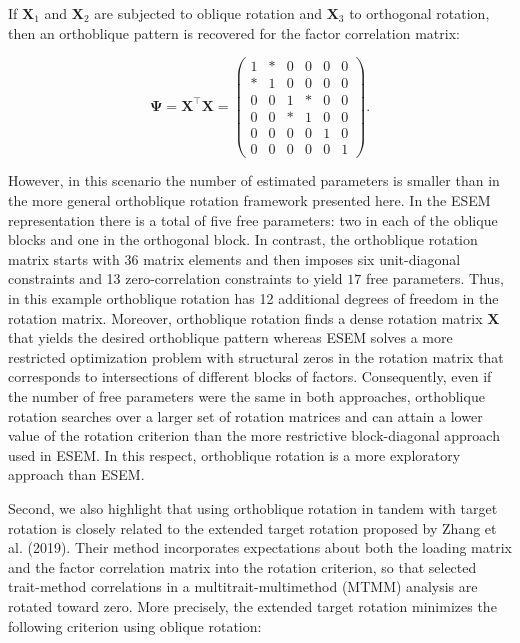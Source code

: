 \documentclass[
  12pt,
  letterpaper,
  article]{scrartcl}
\begin{document}
If \(\mathbf{X}_1\) and \(\mathbf{X}_2\) are subjected to oblique
rotation and \(\mathbf{X}_3\) to orthogonal rotation, then an
orthoblique pattern is recovered for the factor correlation matrix:

\[
\mathbf{\Psi} =
\mathbf{X}^\top\mathbf{X} =
\left(
\begin{array}{cc|cc|cc}
1&\ast&0&0&0&0\\
\ast&1&0&0&0&0\\ \hline
0&0&1&\ast&0&0\\
0&0&\ast&1&0&0\\ \hline
0&0&0&0&1&0\\
0&0&0&0&0&1
\end{array}
\right).
\]

However, in this scenario the number of estimated parameters is smaller
than in the more general orthoblique rotation framework presented here.
In the ESEM representation there is a total of five free parameters: two
in each of the oblique blocks and one in the orthogonal block. In
contrast, the orthoblique rotation matrix starts with 36 matrix elements
and then imposes six unit-diagonal constraints and 13 zero-correlation
constraints to yield \(17\) free parameters. Thus, in this example
orthoblique rotation has 12 additional degrees of freedom in the
rotation matrix. Moreover, orthoblique rotation finds a dense rotation
matrix \(\mathbf{X}\) that yields the desired orthoblique pattern
whereas ESEM solves a more restricted optimization problem with
structural zeros in the rotation matrix that corresponds to
intersections of different blocks of factors. Consequently, even if the
number of free parameters were the same in both approaches, orthoblique
rotation searches over a larger set of rotation matrices and can attain
a lower value of the rotation criterion than the more restrictive
block-diagonal approach used in ESEM. In this respect, orthoblique
rotation is a more exploratory approach than ESEM.

Second, we also highlight that using orthoblique rotation in tandem with
target rotation is closely related to the extended target rotation
proposed by Zhang et al. (2019). Their method incorporates expectations
about both the loading matrix and the factor correlation matrix into the
rotation criterion, so that selected trait-method correlations in a
multitrait-multimethod (MTMM) analysis are rotated toward zero. More
precisely, the extended target rotation minimizes the following
criterion using oblique rotation:
\end{document}
